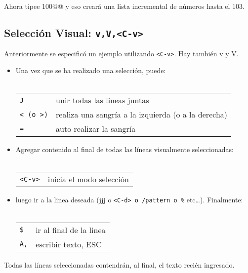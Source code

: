 \documentclass[12pt]{article}
\begin{document}
Ahora tipee 100@@ y eso creará una lista incremental de números hasta el 103.



\subsection{Selección Visual: \texttt{v,V,<C-v>}}


Anteriormente se especificó un ejemplo utilizando \texttt{<C-v>}.
Hay también v y V. 


\begin{itemize}
	\item Una vez que se ha realizado una selección, puede: \\ \\
\begin{tabular}{ l l }
	\texttt{J} & unir todas las lineas juntas \\
	\texttt{< (o >)} & realiza una sangría a la izquierda (o a la derecha) \\
	\texttt{=} & auto realizar la sangría \\
\end{tabular}
\end{itemize}





\begin{itemize}
	\item Agregar contenido al final de todas las líneas visualmente seleccionadas: \\ \\
\begin{tabular}{ l l }
	\texttt{<C-v>} & inicia el modo selección \\
\end{tabular}
\end{itemize}
\begin{itemize}
    \item luego ir a la linea deseada (jjj o \texttt{<C-d> o /pattern o \%} etc…). Finalmente: \\ \\
\begin{tabular}{ l l }
	\texttt{\$} & ir al final de la linea \\
	\texttt{A,} & escribir texto, ESC \\
\end{tabular}
\end{itemize}

Todas las líneas seleccionadas contendrán, al final, el texto recién ingresado.
\end{document}
